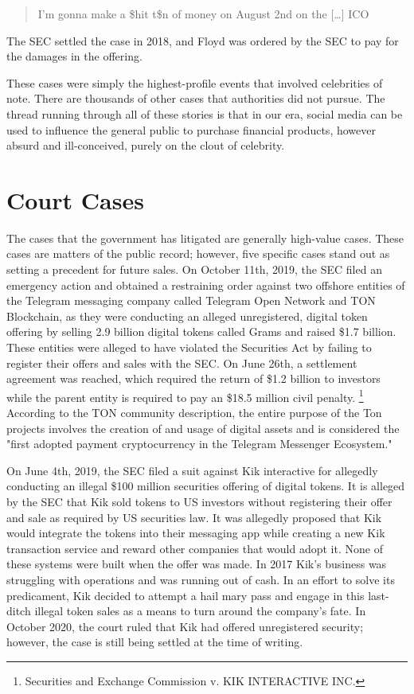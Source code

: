 
\begin{quote}
I'm gonna make a \$hit t\$n of money on August 2nd on the {[}\ldots{]}
ICO
\end{quote}

The SEC settled the case in 2018, and Floyd was ordered by the SEC to pay for
the damages in the offering.

These cases were simply the highest-profile events that involved celebrities of
note. There are thousands of other cases that authorities did not pursue. The
thread running through all of these stories is that in our era, social media can
be used to influence the general public to purchase financial products, however
absurd and ill-conceived, purely on the clout of celebrity.

\section{Court Cases}

The cases that the government has litigated are generally high-value cases.
These cases are matters of the public record; however, five specific cases stand
out as setting a precedent for future sales. On October 11th, 2019, the SEC
filed \cite{noauthor_securities_2020-2} an emergency action and obtained a
restraining order against two offshore entities of the Telegram messaging
company called Telegram Open Network and TON Blockchain, as they were conducting
an alleged unregistered, digital token offering by selling 2.9 billion digital
tokens called Grams and raised \$1.7 billion. These entities were alleged to
have violated the Securities Act by failing to register their offers and sales
with the SEC. On June 26th, a settlement agreement was reached, which required
the return of \$1.2 billion to investors while the parent entity is required to
pay an \$18.5 million civil penalty. \footnote{Securities and Exchange
Commission v. KIK INTERACTIVE INC.} According to the TON community description,
the entire purpose of the Ton projects involves the creation of and usage of
digital assets and is considered the "first adopted payment cryptocurrency in
the Telegram Messenger Ecosystem."


On June 4th, 2019, the SEC filed a suit against Kik interactive for allegedly
conducting an illegal \$100 million securities offering of digital tokens. It is
alleged by the SEC that Kik sold tokens to US investors without registering
their offer and sale as required by US securities law. It was allegedly proposed
that Kik would integrate the tokens into their messaging app while creating a
new Kik transaction service and reward other companies that would adopt it. None
of these systems were built when the offer was made. In 2017 Kik's business was
struggling with operations and was running out of cash. In an effort to solve
its predicament, Kik decided to attempt a hail mary pass and engage in this
last-ditch illegal token sales as a means to turn around the company's fate. In
October 2020, the court ruled that Kik had offered unregistered security;
however, the case is still being settled at the time of writing.

